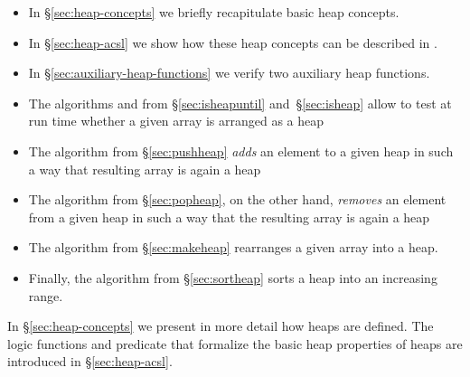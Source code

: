 \begin{itemize}
\item In \S\ref{sec:heap-concepts} we briefly recapitulate basic
      heap concepts.

\item In \S\ref{sec:heap-acsl} we show how these heap concepts
      can be described in \acsl.

\item In \S\ref{sec:auxiliary-heap-functions} we verify two
      auxiliary heap functions.

\item The algorithms \isheapuntil and \isheap from
      \S\ref{sec:isheapuntil} and~\S\ref{sec:isheap}
      allow to test at run time whether a given array is arranged as a heap

\item The algorithm \pushheap from \S\ref{sec:pushheap} \emph{adds} an
        element to a given heap in such a way
        that resulting array is again a heap

\item The algorithm \popheap from \S\ref{sec:popheap}, on the other hand,
        \emph{removes} an element from a given heap in
        such a way that the resulting array is again a heap

\item The algorithm \makeheap from \S\ref{sec:makeheap} rearranges a given array
        into a heap.

\item Finally, the algorithm \sortheap from \S\ref{sec:sortheap} sorts a heap
        into an increasing range.
\end{itemize}


In \S\ref{sec:heap-concepts} we present in more detail how heaps are defined.
The \acsl logic functions and predicate that formalize the basic heap
properties of heaps are introduced in \S\ref{sec:heap-acsl}.


\clearpage












